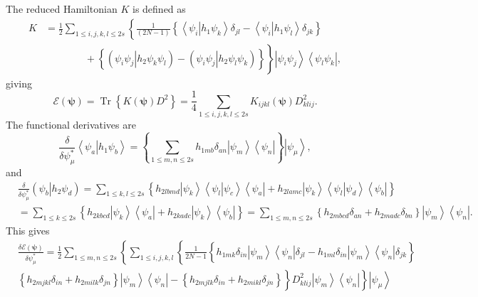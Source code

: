 \documentclass[aps,preprint]{revtex4}%
\begin{document}
The reduced Hamiltonian $K$ is defined as
\begin{align}
K  &  =\frac{1}{2}\sum_{1\leq i,j,k,l\leq2s}\left\{  \frac{1}{\left(
2N-1\right)  }\overset{}{\left\{  \left\langle \left.  \psi_{i}\right\vert
h_{1}\psi_{k}\right\rangle \delta_{jl}-\left\langle \left.  \psi
_{i}\right\vert h_{1}\psi_{l}\right\rangle \delta_{jk}\right\}  }\right. \\
&  \qquad\qquad+\left.  \overset{}{\left\{  \left(  \left.  \psi_{i}\psi
_{j}\right\vert h_{2}\psi_{k}\psi_{l}\right)  -\left(  \left.  \psi_{i}%
\psi_{j}\right\vert h_{2}\psi_{l}\psi_{k}\right)  \right\}  }\right\}
\left\vert \psi_{i}\psi_{j}\right\rangle \left\langle \psi_{l}\psi
_{k}\right\vert ,
\end{align}
giving
\begin{equation}
\mathcal{E}\left(  \mathbf{\psi}\right)  =\operatorname{Tr}\left\{  K\left(
\mathbf{\psi}\right)  D^{2}\right\}  =\frac{1}{4}\sum_{1\leq i,j,k,l\leq
2s}K_{ijkl}\left(  \mathbf{\psi}\right)  D_{klij}^{2}.
\end{equation}
The functional derivatives are
\begin{equation}
\frac{\delta}{\delta\psi_{\mu}^{\ast}}\left\langle \left.  \psi_{a}\right\vert
h_{1}\psi_{b}\right\rangle =\left\{  \sum_{1\leq m,n\leq2s}h_{1mb}\delta
_{an}\left\vert \psi_{m}\right\rangle \left\langle \psi_{n}\right\vert
\right\}  \left\vert \psi_{\mu}\right\rangle ,
\end{equation}
and%
\begin{align}
&  \frac{\delta}{\delta\psi_{\mu}^{\ast}}\left(  \left.  \psi_{b}\right\vert
h_{2}\psi_{d}\right)  \left.  =\right.  \sum_{1\leq k,l\leq2s}\left\{
h_{2lbmd}\left\vert \psi_{k}\right\rangle \left\langle \left.  \psi
_{l}\right\vert \psi_{c}\right\rangle \left\langle \psi_{a}\right\vert
+h_{2lamc}\left\vert \psi_{k}\right\rangle \left\langle \left.  \psi
_{l}\right\vert \psi_{d}\right\rangle \left\langle \psi_{b}\right\vert
\right\} \nonumber\\
&  \left.  =\right.  \sum_{1\leq k\leq2s}\left\{  h_{2kbcd}\left\vert \psi
_{k}\right\rangle \left\langle \psi_{a}\right\vert +h_{2kadc}\left\vert
\psi_{k}\right\rangle \left\langle \psi_{b}\right\vert \right\}  =\sum_{1\leq
m,n\leq2s}\left\{  h_{2mbcd}\delta_{an}+h_{2madc}\delta_{bn}\right\}
\left\vert \psi_{m}\right\rangle \left\langle \psi_{n}\right\vert .
\end{align}
This gives%
\begin{align}
&  \frac{\delta\mathcal{E}\left(  \mathbf{\psi}\right)  }{\delta\psi_{\mu
}^{\ast}}=\frac{1}{2}\sum_{1\leq m,n\leq2s}\left\{  \sum_{1\leq i,j,k,l}%
\left\{  \frac{1}{2N-1}\left\{  \overset{}{h_{1mk}\delta_{in}\left\vert
\psi_{m}\right\rangle \left\langle \psi_{n}\right\vert \delta_{jl}}%
-h_{1ml}\delta_{in}\left\vert \psi_{m}\right\rangle \left\langle \psi
_{n}\right\vert \delta_{jk}\right\}  \right.  \right. \\
&  \left.  \left.  \overset{}{\left\{  h_{2mjkl}\delta_{in}+h_{2milk}%
\delta_{jn}\right\}  \left\vert \psi_{m}\right\rangle \left\langle \psi
_{n}\right\vert -\left\{  h_{2mjlk}\delta_{in}+h_{2mikl}\delta_{jn}\right\}
}\right\}  D_{klij}^{2}\left\vert \psi_{m}\right\rangle \left\langle \psi
_{n}\right\vert \right\}  \left\vert \psi_{\mu}\right\rangle
\end{align}%
\end{document}
